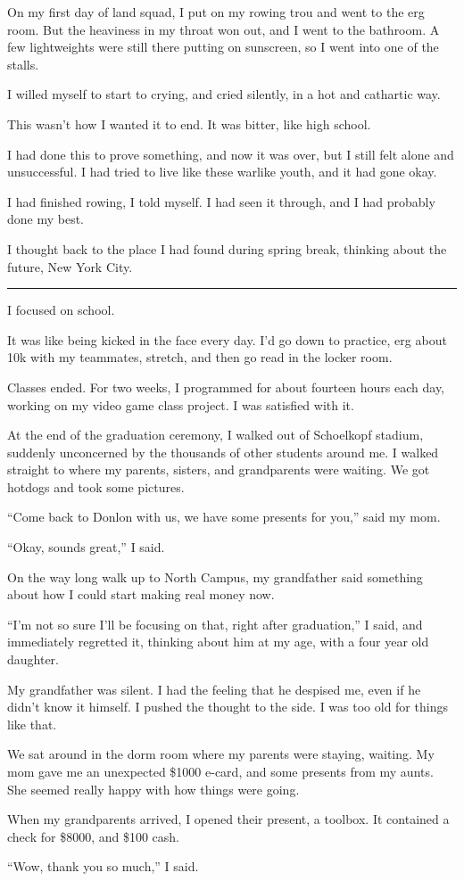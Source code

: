 On my first day of land squad, I put on my rowing trou and went to the erg room.
But the heaviness in my throat won out, and I went to the bathroom.  A few
lightweights were still there putting on sunscreen, so I went into one of the
stalls.

I willed myself to start to crying, and cried silently, in a hot and cathartic
way.

This wasn't how I wanted it to end.  It was bitter, like high school.

I had done this to prove something, and now it was over, but I still felt alone
and unsuccessful.  I had tried to live like these warlike youth, and it had gone
okay.

I had finished rowing, I told myself.  I had seen it through, and I had probably
done my best.

I thought back to the place I had found during spring break, thinking about the
future, New York City.

\plainfancybreak{12pt}{2}{}

I focused on school.

It was like being kicked in the face every day.  I'd go down to practice, erg
about 10k with my teammates, stretch, and then go read in the locker room.

Classes ended.  For two weeks, I programmed for about fourteen hours each day,
working on my video game class project.  I was satisfied with it.

At the end of the graduation ceremony, I walked out of Schoelkopf stadium,
suddenly unconcerned by the thousands of other students around me.  I walked
straight to where my parents, sisters, and grandparents were waiting.  We got
hotdogs and took some pictures.

``Come back to Donlon with us, we have some presents for you,'' said my mom.

``Okay, sounds great,'' I said.

On the way long walk up to North Campus, my grandfather said something about how
I could start making real money now.

``I'm not so sure I'll be focusing on that, right after graduation,'' I said,
and immediately regretted it, thinking about him at my age, with a four year old
daughter.

My grandfather was silent.  I had the feeling that he despised me, even if he
didn't know it himself.  I pushed the thought to the side.  I was too old for
things like that.

We sat around in the dorm room where my parents were staying, waiting.  My mom
gave me an unexpected \$1000 e-card, and some presents from my aunts.  She
seemed really happy with how things were going.

When my grandparents arrived, I opened their present, a toolbox.  It contained a
check for \$8000, and \$100 cash.

``Wow, thank you so much,'' I said.
